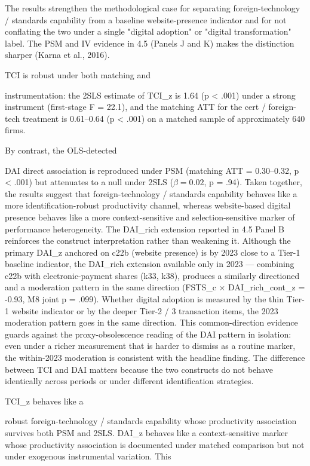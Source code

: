 \documentclass[12pt,a4paper]{article}
\begin{document}
The results strengthen the methodological case for separating
foreign-technology / standards capability from a baseline
website-presence indicator and for not conflating the two under a single
"digital adoption" or "digital transformation" label. The PSM and IV
evidence in 4.5 (Panels J and K) makes the distinction sharper (Karna et
al., 2016).

TCI is robust under both matching and

instrumentation: the 2SLS estimate of TCI\_z is 1.64 (p \textless{}
.001) under a strong instrument (first-stage F = 22.1), and the matching
ATT for the cert / foreign-tech treatment is 0.61--0.64 (p \textless{}
.001) on a matched sample of approximately 640 firms.

By contrast, the OLS-detected

DAI direct association is reproduced under PSM (matching ATT =
0.30--0.32, p \textless{} .001) but attenuates to a null under 2SLS
(\(\beta = 0.02\), p = .94). Taken together, the results suggest that
foreign-technology / standards capability behaves like a more
identification-robust productivity channel, whereas website-based
digital presence behaves like a more context-sensitive and
selection-sensitive marker of performance heterogeneity. The DAI\_rich
extension reported in 4.5 Panel B reinforces the construct
interpretation rather than weakening it. Although the primary DAI\_z
anchored on c22b (website presence) is by 2023 close to a Tier-1
baseline indicator, the DAI\_rich extension available only in 2023 ---
combining c22b with electronic-payment shares (k33, k38), produces a
similarly directioned and a moderation pattern in the same direction
(FSTS\_c × DAI\_rich\_cont\_z = -0.93, M8 joint p = .099). Whether
digital adoption is measured by the thin Tier-1 website indicator or by
the deeper Tier-2 / 3 transaction items, the 2023 moderation pattern
goes in the same direction. This common-direction evidence guards
against the proxy-obsolescence reading of the DAI pattern in isolation:
even under a richer measurement that is harder to dismiss as a routine
marker, the within-2023 moderation is consistent with the headline
finding. The difference between TCI and DAI matters because the two
constructs do not behave identically across periods or under different
identification strategies.

TCI\_z behaves like a

robust foreign-technology / standards capability whose productivity
association survives both PSM and 2SLS. DAI\_z behaves like a
context-sensitive marker whose productivity association is documented
under matched comparison but not under exogenous instrumental variation.
This
\end{document}
